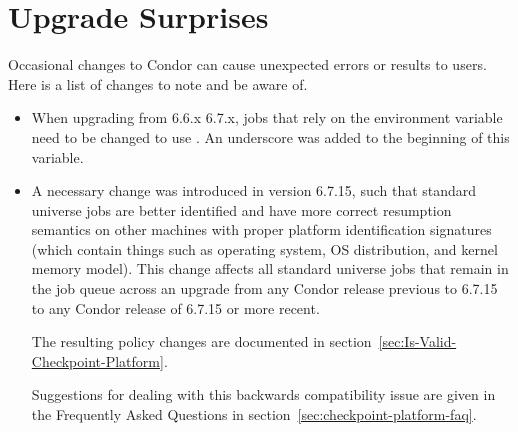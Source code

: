 \section{\label{sec:gotchas}Upgrade Surprises}

Occasional changes to Condor can cause unexpected errors or results
to users.
Here is a list of changes to note and be aware of.

\begin{itemize}

\item When upgrading from 6.6.x 6.7.x,
  jobs that rely on the environment variable 
  need to be changed to use .
  An underscore was added to the beginning of this variable.

\item A necessary change was introduced in version 6.7.15, such that
  standard universe jobs are better identified and have more
  correct resumption semantics on other machines with proper platform
  identification signatures (which contain things such as operating system,
  OS distribution, and kernel memory model). This change affects all
  standard universe jobs that remain in the job queue across an upgrade
  from any Condor release previous to 6.7.15 to any Condor release of
  6.7.15 or more recent.

  The resulting policy changes are documented in
  section~\ref{sec:Is-Valid-Checkpoint-Platform}.

  Suggestions for dealing with this backwards compatibility issue
  are given in the Frequently Asked Questions in
  section~\ref{sec:checkpoint-platform-faq}.


\end{itemize}

